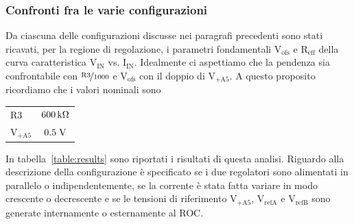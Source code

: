 \subsubsection{Confronti fra le varie configurazioni}

Da ciascuna delle configurazioni discusse nei paragrafi precedenti sono stati ricavati, per la regione di regolazione, i parametri fondamentali $\mathrm{V_{ofs}}$ e $\mathrm{R_{eff}}$ della curva caratteristica $\mathrm{V_{IN}}$ vs. $\mathrm{I_{IN}}$. Idealmente ci aspettiamo che la pendenza sia confrontabile con $\nicefrac{\mathrm{R3}}{1000}$ e $\mathrm{V_{ofs}}$ con il doppio di $\mathrm{V_{+A5}}$. A questo proposito ricordiamo che i valori nominali sono 
\begin{center}
\begin{tabular}{lc}
\hline
$\mathrm{R3}$ & $600{\rm \, k\Omega}$ \\%
$\mathrm{V_{+A5}}$ & $0.5\rm \; V$\\
\hline
\end{tabular}
\end{center}

In tabella~\ref{table:results} sono riportati i risultati di questa analisi. Riguardo alla descrizione della configurazione è specificato se i due regolatori sono alimentati in parallelo o indipendentemente, se la corrente è stata fatta variare in modo crescente o decrescente e se le tensioni di riferimento $\mathrm{V_{+A5}}$, $\mathrm{V_{refA}}$ e $\mathrm{V_{refB}}$ sono generate internamente o esternamente al ROC.

